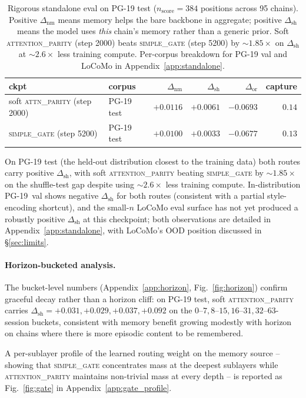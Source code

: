 \documentclass{article}
\newcommand{\mhyph}{\text{--}}
\newcommand{\dnm}{\Delta_{\text{nm}}}
\newcommand{\dsh}{\Delta_{\text{sh}}}
\newcommand{\dor}{\Delta_{\text{or}}}
\begin{document}
\begin{table}[t]
\centering
\caption{Rigorous standalone eval on PG-19 test
($n_{\text{score}}=384$ positions across 95 chains).  Positive $\dnm$
means memory helps the bare backbone in aggregate; positive $\dsh$
means the model uses \emph{this} chain's memory rather than a generic
prior.  Soft \textsc{attention\_parity} (step 2000) beats
\textsc{simple\_gate} (step 5200) by ${\sim}1.85\times$ on $\dsh$ at
${\sim}2.6\times$ less training compute.  Per-corpus
breakdown for PG-19 val and LoCoMo in Appendix~\ref{app:standalone}.}
\label{tab:standalone}
\small
\begin{tabular}{llrrrr}
\toprule
ckpt & corpus & $\dnm$ & $\dsh$ & $\dor$ & capture \\
\midrule
soft \textsc{attn\_parity} (step 2000) & PG-19 test & $+0.0116$ & $+0.0061$ & $-0.0693$ & $0.14$ \\
\textsc{simple\_gate} (step 5200)      & PG-19 test & $+0.0100$ & $+0.0033$ & $-0.0677$ & $0.13$ \\
\bottomrule
\end{tabular}
\end{table}

On PG-19 test (the held-out distribution closest to the training
data) both routes carry positive $\dsh$, with soft
\textsc{attention\_parity} beating \textsc{simple\_gate} by
${\sim}1.85\times$ on the shuffle-test gap despite using
${\sim}2.6\times$ less training compute.  In-distribution PG-19~val
shows negative $\dsh$ for both routes (consistent with a partial
style-encoding shortcut), and the small-$n$ LoCoMo eval surface has
not yet produced a robustly positive $\dsh$ at this checkpoint;
both observations are detailed in Appendix~\ref{app:standalone}, with
LoCoMo's OOD position discussed in \S\ref{sec:limits}.

\paragraph{Horizon-bucketed analysis.}
The bucket-level numbers (Appendix~\ref{app:horizon},
Fig.~\ref{fig:horizon}) confirm graceful decay rather than a horizon
cliff: on PG-19 test, soft \textsc{attention\_parity} carries
$\dsh = +0.031, +0.029, +0.037, +0.092$ on the
$0\mhyph7, 8\mhyph15, 16\mhyph31, 32\mhyph63$-session buckets,
consistent with memory benefit growing modestly with horizon on
chains where there is more episodic content to be remembered.

A per-sublayer profile of the learned routing weight on the memory
source -- showing that \textsc{simple\_gate} concentrates mass at the
deepest sublayers while \textsc{attention\_parity} maintains
non-trivial mass at every depth -- is reported as
Fig.~\ref{fig:gate} in Appendix~\ref{app:gate_profile}.
\end{document}
